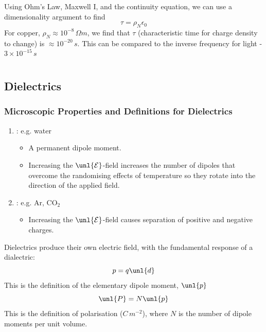 \documentclass[a4paper, 11pt, normalem]{report}
\newcommand\E{\mathcal{E}}
\newcommand\uE{\unl{\E}}
\newcommand\eno{\epsilon_0}
\begin{document}
Using Ohm's Law, Maxwell \RN{1}, and the continuity equation, we can use a dimensionality argument to find
\begin{equation}
    \tau = \rho_N\eno
\end{equation}
For copper, $\rho_N \approx 10^{-8}\,\Omega m$, we find that $\tau$ (characteristic time for charge density to change) is $\approx 10^{-20}\,s$.
This can be compared to the inverse frequency for light - $3\times10^{-15}\,s$

\chapter{}
\section{Dielectrics}
\subsection{Microscopic Properties and Definitions for Dielectrics}
\begin{enumerate}
    \item {}: e.g. water
    \begin{itemize}
        \item A permanent dipole moment.
        \item Increasing the $\uE$-field increases the number of dipoles that overcome the randomising effects of temperature so they rotate into the direction of the applied field.
    \end{itemize}
    \item {}: e.g. Ar, CO$_2$
    \begin{itemize}
        \item Increasing the $\uE$-field causes separation of positive and negative charges.
    \end{itemize}
\end{enumerate}
Dielectrics produce their own electric field, with the fundamental response of a dialectric:
\begin{equation}
    p = q\unl{d}
\end{equation}
This is the definition of the elementary dipole moment, $\unl{p}$
\begin{equation}
    \unl{P} = N\unl{p}
\end{equation}
This is the definition of polarisation ($C\,m^{-2}$), where $N$ is the number of dipole moments per unit volume.
\end{document}
